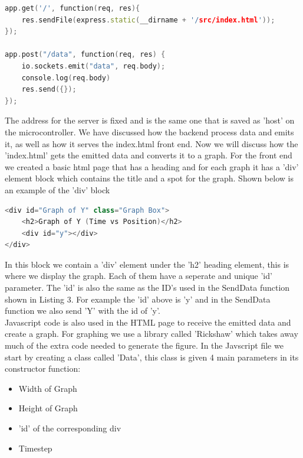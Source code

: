 \documentclass[conference]{IEEEtran}
\begin{document}
\begin{lstlisting}[language=C++, caption=Server Code Snippet]
app.get('/', function(req, res){
    res.sendFile(express.static(__dirname + '/src/index.html'));
});

app.post("/data", function(req, res) {
    io.sockets.emit("data", req.body);
    console.log(req.body)
    res.send({});
});\end{lstlisting}

    The address for the server is fixed and is the same one that is saved as 'host' on the microcontroller. We
    have discussed how the backend process data and emits it, as well as how it serves the index.html
    front end. Now we will discuss how the 'index.html' gets the emitted data and converts it to a 
    graph. For the front end we created a basic html page that has a heading and for each graph
    it has a 'div' element block which contains the title and a spot for the graph. Shown below
    is an example of the 'div' block

\begin{lstlisting}[language=C++, caption=HTML Graph Div Snippet]
<div id="Graph of Y" class="Graph Box">
    <h2>Graph of Y (Time vs Position)</h2>
    <div id="y"></div>
</div>\end{lstlisting}

    In this block we contain a 'div' element under the 'h2' heading element, this is where we display
    the graph. Each of them have a seperate and unique 'id' parameter. The 'id' is also the same as the
    ID's used in the SendData function shown in Listing 3. For example the 'id' above is 'y' and in the
    SendData function we also send 'Y' with the id of 'y'.\\

    Javascript code is also used in the HTML page to receive the emitted data and create a graph.
    For graphing we use a library called 'Rickshaw' which takes away much of the extra code needed to
    generate the figure. In the Javscript file we start by creating a class called 'Data', this class
    is given 4 main parameters in its constructor function:\\

    \begin{itemize}
        \item Width of Graph
        \item Height of Graph
        \item 'id' of the corresponding div
        \item Timestep\\
    \end{itemize}
\end{document}
